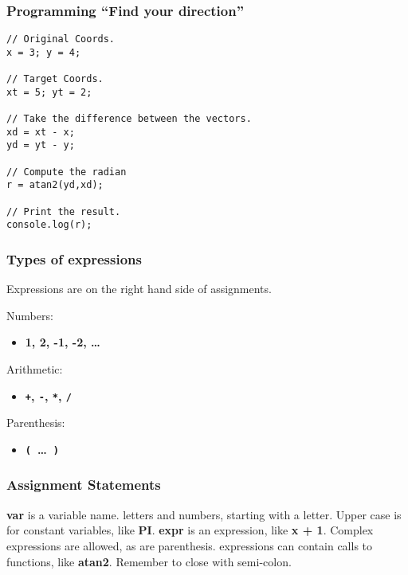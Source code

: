 \documentclass{beamer}
\begin{document}
\begin{frame}[fragile]
\frametitle{Programming ``Find your direction''}

\begin{codeblock}
\begin{verbatim}
// Original Coords.
x = 3; y = 4;

// Target Coords.
xt = 5; yt = 2;

// Take the difference between the vectors.
xd = xt - x;
yd = yt - y;

// Compute the radian                                                                                                         
r = atan2(yd,xd);

// Print the result.
console.log(r);
\end{verbatim}                
\end{codeblock}
\end{frame}

\begin{frame}[fragile]
\frametitle{Types of expressions}
\Large

Expressions are on the right hand side of assignments.

Numbers:
\begin{itemize}
\item {\bf 1, 2, -1, -2, \ldots}
\end{itemize}

Arithmetic:
\begin{itemize}
\item {\bf \verb$+$, \verb$-$, \verb$*$, \verb$/$}
\end{itemize}

Parenthesis:
\begin{itemize}
\item {\bf \verb$($~\ldots~\verb$)$}
\end{itemize}

\end{frame}

\begin{frame}[fragile]
\frametitle{Assignment Statements}
\Large

{}

\frameskip{}
{\bf var} is a variable name. letters and numbers, starting with a letter.
Upper case is for constant variables, like {\bf PI}.
\frameskip{}
{\bf expr} is an expression, like {\bf x + 1}. Complex expressions are allowed,
as are parenthesis. expressions can contain calls to functions, like {\bf atan2}.
\frameskip{}
Remember to close with semi-colon.

\end{frame}
\end{document}
